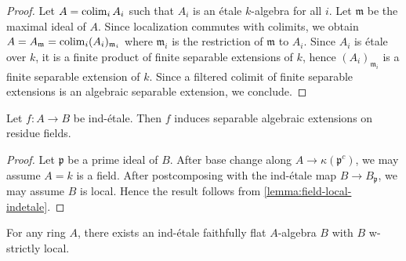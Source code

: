 \begin{proof}
    Let $A = \operatorname{colim}_i A_i$ such that $A_i$ is an étale $k$-algebra for all $i$.
    Let $\mathfrak{m}$ be the maximal ideal of $A$. Since localization commutes with colimits,
    we obtain $A = A_{\mathfrak{m}} = \operatorname{colim}_i (A_i)_{\mathfrak{m}_i}$ where
    $\mathfrak{m}_i$ is the restriction of $\mathfrak{m}$ to $A_i$. Since $A_i$ is étale over $k$,
    it is a finite product of finite separable extensions of $k$, hence $(A_i)_{\mathfrak{m}_i}$
    is a finite separable extension of $k$. Since a filtered colimit of finite separable
    extensions is an algebraic separable extension, we conclude.
\end{proof}

\begin{proposition}
    Let $f\colon A \to B$ be ind-étale. Then $f$ induces separable algebraic extensions on residue fields.
    \label{prop:ind-etale-residue-fields}
\end{proposition}

\begin{proof}
    Let $\mathfrak{p}$ be a prime ideal of $B$. After base change along $A \to \kappa(\mathfrak{p}^c)$,
    we may assume $A = k$ is a field. After postcomposing with the ind-étale map $B \to B_{\mathfrak{p}}$,
    we may assume $B$ is local. Hence the result follows from \ref{lemma:field-local-indetale}.
\end{proof}

\begin{proposition}
    For any ring \(A\), there exists an ind-étale faithfully flat \(A\)-algebra \(B\) with \(B\) w-strictly local.
    \label{thm:ind-etale-w-strictly-local-cover}
\end{proposition}

